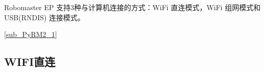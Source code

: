 
Robomaster EP 支持3种与计算机连接的方式：WiFi 直连模式，WiFi 组网模式和 USB(RNDIS) 连接模式。

\autoref{sub_PyRM2_1} 

\subsection{WIFI直连}\label{sub_PyRM2_1}

